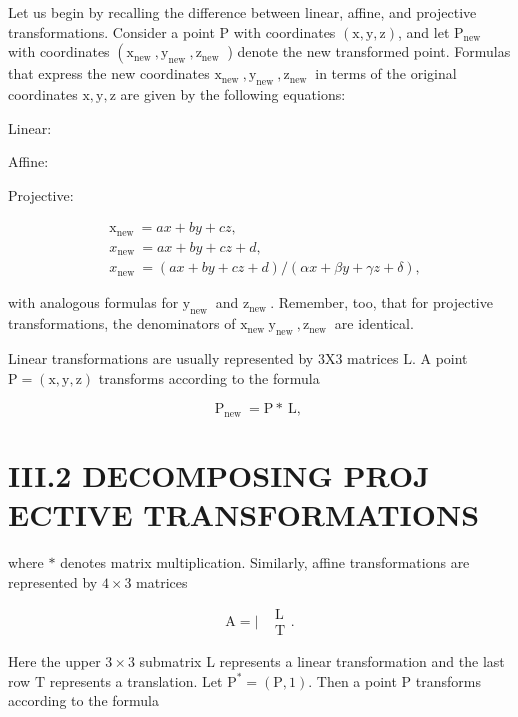 Let us begin by recalling the difference between linear, affine, and projective transformations. Consider a point $\mathrm{P}$ with coordinates $(\mathrm{x}, \mathrm{y}, \mathrm{z})$, and let $\mathrm{P}_{\text {new }}$ with coordinates $\left(\mathrm{x}_{\text {new }}, \mathrm{y}_{\text {new }}, \mathrm{z}_{\text {new }}\right.$ ) denote the new transformed point. Formulas that express the new coordinates $\mathrm{x}_{\text {new }}, \mathrm{y}_{\text {new }}, \mathrm{z}_{\text {new }}$ in terms of the original coordinates $\mathrm{x}, \mathrm{y}, \mathrm{z}$ are given by the following equations:

Linear:

Affine:

Projective:

$$
\begin{aligned}
&\mathrm{x}_{\text {new }}=a x+b y+c z, \\
&x_{\text {new }}=a x+b y+c z+d, \\
&x_{\text {new }}=(a x+b y+c z+d) /(\alpha x+\beta y+\gamma z+\delta),
\end{aligned}
$$

with analogous formulas for $\mathrm{y}_{\text {new }}$ and $\mathrm{z}_{\text {new }}$. Remember, too, that for projective transformations, the denominators of $\mathrm{x}_{\text {new }} \mathrm{y}_{\text {new }}, \mathrm{z}_{\text {new }}$ are identical.

Linear transformations are usually represented by $3 \mathrm{X} 3$ matrices $\mathrm{L}$. A point $\mathrm{P}=(\mathrm{x}, \mathrm{y}, \mathrm{z})$ transforms according to the formula

$$
\mathrm{P}_{\text {new }}=\mathrm{P} * \mathrm{~L} \text {, }
$$

\section{III.2 DECOMPOSING PROJ ECTIVE TRANSFORMATIONS}
where $*$ denotes matrix multiplication. Similarly, affine transformations are represented by $4 \times 3$ matrices

$$
\mathrm{A}=\mid \begin{aligned}
&\mathrm{L} \\
&\mathrm{T}
\end{aligned} .
$$

Here the upper $3 \times 3$ submatrix L represents a linear transformation and the last row $\mathrm{T}$ represents a translation. Let $\mathrm{P}^{*}=(\mathrm{P}, 1)$. Then a point $\mathrm{P}$ transforms according to the formula

